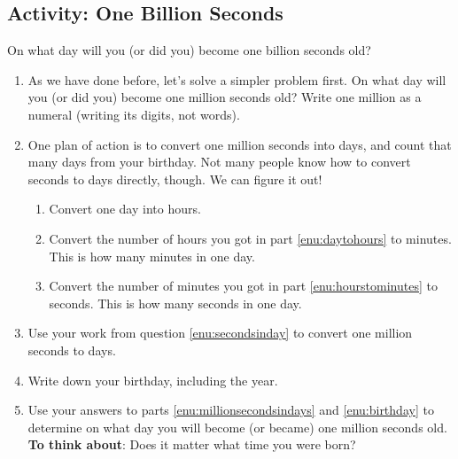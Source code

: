 \subsection{Activity: One Billion Seconds}
On what day will you (or did you) become one billion seconds old?
\begin{enumerate}
	\item \label{enu:billionsecondsbegin}As we have done before, let's solve a simpler problem first. On what day will you (or did you) become one million seconds old? Write one million as a numeral (writing its digits, not words). \wbvfill
	\item \label{enu:secondsinday}One plan of action is to convert one million seconds into days, and count that many days from your birthday. Not many people know how to convert seconds to days directly, though. We can figure it out!
	\begin{enumerate}
		\item \label{enu:daytohours}Convert one day into hours. \wbvfill
		\item \label{enu:hourstominutes}Convert the number of hours you got in part \ref{enu:daytohours} to minutes. This is how many minutes in one day. \wbvfill
		\item Convert the number of minutes you got in part \ref{enu:hourstominutes} to seconds. This is how many seconds in one day. \wbvfill
	\end{enumerate}
	\item \label{enu:millionsecondsindays}Use your work from question \ref{enu:secondsinday} to convert one million seconds to days.  \wbvfill
	\item \label{enu:birthday}Write down your birthday, including the year. \wbvfill
	\item \label{enu:billionsecondsend}Use your answers to parts \ref{enu:millionsecondsindays} and \ref{enu:birthday} to determine on what day you will become (or became) one million seconds old.\\ \textbf{To think about}: Does it matter what time you were born?  \wbvfill\wbnewpage

\end{enumerate}
